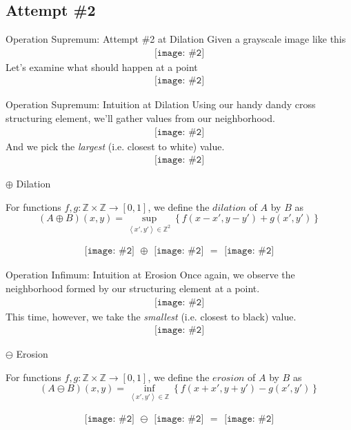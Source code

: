 \documentclass{beamer}
\newcommand{\pic}[2]{
     \begin{array}{l}
      \texttt{[image: \#2]}
      \end{array}
}
\newcommand{\set}[1]{\left\lbrace #1 \right\rbrace}
\newcommand{\tuple}[1]{\left\langle #1 \right\rangle}
\newcommand{\integers}{\mathbb{Z}}
\newcommand{\dilate}{\oplus}
\newcommand{\erode}{\ominus}
\begin{document}
\subsection{Attempt \#2}

\begin{frame}{Operation Supremum: Attempt \#2 at Dilation}
  Given a grayscale image like this
  $$\pic{width=50pt}{images/grayscale_tiles.png}$$  
  Let's examine what should happen at a point
  $$\pic{width=50pt}{images/grayscale_tiles_point.png}$$
\end{frame}

\begin{frame}{Operation Supremum: Intuition at Dilation}
  Using our handy dandy cross structuring element, we'll gather values from
  our neighborhood.
  $$\pic{width=50pt}{images/grayscale_tiles_neighborhood.png}$$  
  And we pick the \emph{largest} (i.e. closest to white) value.
  $$\pic{width=50pt}{images/grayscale_tiles_point_replacement.png}$$
\end{frame}

\begin{frame}{$\dilate$ Dilation}
\begin{definition}
  For functions $f,g: \mathbb{Z}\times\mathbb{Z}\rightarrow [0,1]$,
  we define the $dilation$ of $A$ by $B$ as
  $$(A \dilate B)(x,y) = \displaystyle\sup_{\tuple{x',y'} \in \integers^2}
                                      \set{f(x-x',y-y') + g(x',y')}$$
\end{definition}
  $$\pic{width=50pt}{images/grayscale_tiles.png}
    \dilate \pic{width=50pt}{images/cross_inverted.png}
     = \pic{width=50pt}{images/grayscale_tiles_dilated.png}$$
\end{frame}

\begin{frame}{Operation Infimum: Intuition at Erosion}
  Once again, we observe the neighborhood formed by our structuring element
  at a point.
  $$\pic{width=50pt}{images/grayscale_tiles_neighborhood2.png}$$
  This time, however, we take the \emph{smallest} (i.e. closest to black)
  value.
  $$\pic{width=50pt}{images/grayscale_tiles_point_replacement2.png}$$
\end{frame}

\begin{frame}{$\erode$ Erosion}
\begin{definition}
  For functions $f,g: \mathbb{Z}\times\mathbb{Z}\rightarrow [0,1]$,
  we define the $erosion$ of $A$ by $B$ as
  $$(A \erode B)(x,y) = \displaystyle\inf_{\tuple{x',y'} \in \mathbb{Z}}
                                      \set{f(x+x',y+y') - g(x',y')}$$
\end{definition}
$$\pic{width=50pt}{images/grayscale_tiles.png}
  \erode \pic{width=50pt}{images/cross_inverted.png}
  = \pic{width=50pt}{images/grayscale_tiles_eroded.png}$$
\end{frame}
\end{document}
